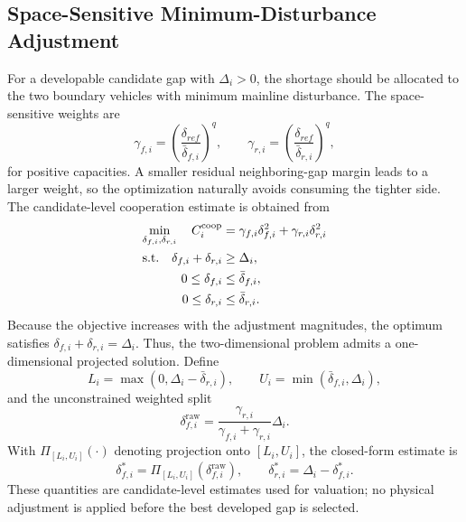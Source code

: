 \documentclass[conference]{IEEEtran}
\begin{document}
\subsection{Space-Sensitive Minimum-Disturbance Adjustment}
For a developable candidate gap with \(\Delta_i>0\), the shortage should be
allocated to the two boundary vehicles with minimum mainline disturbance. The
space-sensitive weights are
\begin{equation}
    \gamma_{f,i}
    =
    \left(\frac{\delta_{ref}}{\bar{\delta}_{f,i}}\right)^q,
    \qquad
    \gamma_{r,i}
    =
    \left(\frac{\delta_{ref}}{\bar{\delta}_{r,i}}\right)^q,
    \label{eq:gamma}
\end{equation}
for positive capacities. A smaller residual neighboring-gap margin leads to a
larger weight, so the optimization naturally avoids consuming the tighter side.
The candidate-level cooperation estimate is obtained from
\begin{align}
    \min_{\delta_{f,i},\delta_{r,i}}\quad
    C_i^{\mathrm{coop}}
    &=
    \gamma_{f,i}\delta_{f,i}^2+
    \gamma_{r,i}\delta_{r,i}^2
    \label{eq:coop_qp}\\
    \mathrm{s.t.}\quad
    \delta_{f,i}+\delta_{r,i}&\geq \Delta_i, \notag\\
    0\leq \delta_{f,i}&\leq \bar{\delta}_{f,i}, \notag\\
    0\leq \delta_{r,i}&\leq \bar{\delta}_{r,i}. \notag
\end{align}
Because the objective increases with the adjustment magnitudes, the optimum
satisfies \(\delta_{f,i}+\delta_{r,i}=\Delta_i\). Thus, the two-dimensional
problem admits a one-dimensional projected solution. Define
\begin{equation}
    L_i=\max(0,\Delta_i-\bar{\delta}_{r,i}),\qquad
    U_i=\min(\bar{\delta}_{f,i},\Delta_i),
    \label{eq:projection_bounds}
\end{equation}
and the unconstrained weighted split
\begin{equation}
    \delta_{f,i}^{\mathrm{raw}}
    =
    \frac{\gamma_{r,i}}{\gamma_{f,i}+\gamma_{r,i}}\Delta_i.
    \label{eq:raw_split}
\end{equation}
With \(\Pi_{[L_i,U_i]}(\cdot)\) denoting projection onto
\([L_i,U_i]\), the closed-form estimate is
\begin{equation}
    \delta_{f,i}^*
    =
    \Pi_{[L_i,U_i]}(\delta_{f,i}^{\mathrm{raw}}),
    \qquad
    \delta_{r,i}^*
    =
    \Delta_i-\delta_{f,i}^*.
    \label{eq:projected_solution}
\end{equation}
These quantities are candidate-level estimates used for valuation; no physical
adjustment is applied before the best developed gap is selected.
\end{document}
